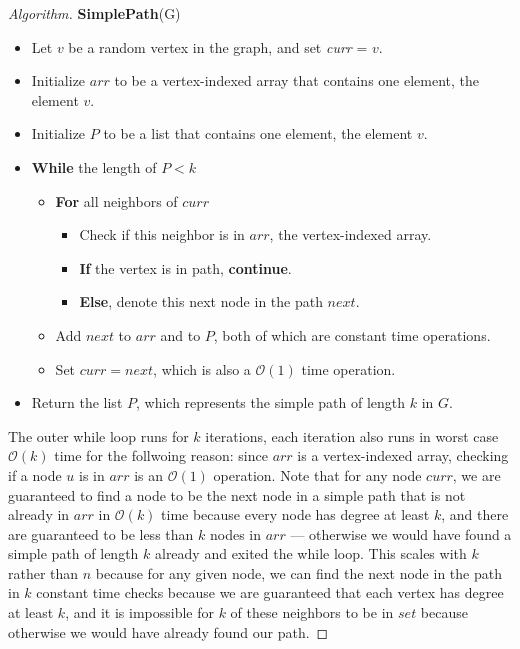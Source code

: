\documentclass[11pt]{article}
\begin{document}
\begin{enumerate}[leftmargin=*,start=0]
\begin{proof}[Algorithm]
  \textbf{SimplePath}(G)
  \begin{itemize}
    \item Let $v$ be a random vertex in the graph, and set \textit{curr} = $v$.
    \item Initialize $arr$ to be a vertex-indexed array that contains one element, the element $v$.
    \item Initialize $P$ to be a list that contains one element, the element $v$.
    \item \textbf{While} the length of $P < k$
    \begin{itemize}
      \item \textbf{For} all neighbors of $curr$
      \begin{itemize}
        \item Check if this neighbor is in $arr$, the vertex-indexed array. 
        \item \textbf{If} the vertex is in path, \textbf{continue}. 
        \item \textbf{Else}, denote this next node in the path $next$.
      \end{itemize}
      \item Add $next$ to $arr$ and to $P$, both of which are constant time operations.
      \item Set $curr = next$, which is also a $\mathcal{O}(1)$ time operation.
    \end{itemize}
    \item Return the list $P$, which represents the simple path of length $k$ in $G$.
  \end{itemize}

  The outer while loop runs for $k$ iterations, each iteration also runs in worst case $\mathcal{O}(k)$ time for the 
  follwoing reason: since $arr$ is a vertex-indexed array, checking if a node $u$ is in $arr$ is an $\mathcal{O}(1)$ operation. Note that for any node $curr$, 
  we are guaranteed to find a node to be the next node in a simple path that is not already in $arr$ in $\mathcal{O}(k)$ time 
  because every node has degree at least $k$, and there are guaranteed to be less than $k$ nodes in $arr$ --- otherwise we would have found a 
  simple path of length $k$ already and exited the while loop. This scales with $k$ rather than $n$ because for any given node, we can find the 
  next node in the path in $k$ constant time checks because we are guaranteed that each vertex has 
  degree at least $k$, and it is impossible for $k$ of these neighbors to be in $set$ because otherwise we would have 
  already found our path. 


\end{proof}
\end{enumerate}
\end{document}
